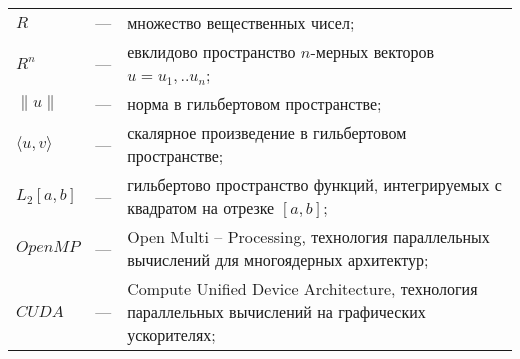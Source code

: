 
\begin{longtable}{lp{}p{}}

$R$ & --- & множество вещественных чисел;\\

$R^n$ & --- & евклидово пространство $n$-мерных векторов $u=u_1,..u_n$;\\

$\|u\|$ & --- & норма в гильбертовом пространстве;\\

$\langle u, v\rangle$ & --- & скалярное произведение в гильбертовом пространстве;\\

$L_2[a, b]$ & --- & гильбертово пространство функций, интегрируемых с квадратом на отрезке $[a, b]$;\\

$OpenMP$ & --- & Open Multi -- Processing, технология параллельных вычислений для многоядерных архитектур;\\

$CUDA$ & --- & Compute Unified Device Architecture, технология параллельных вычислений на графических ускорителях;\\

\end{longtable}
